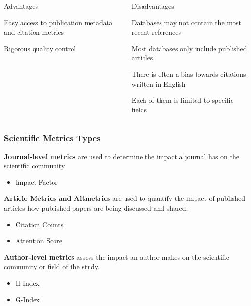 \documentclass{beamer}
\begin{document}
\begin{frame}

    \begin{columns}[T]
        \begin{column}{.5\textwidth}
            \centering Advantages
            \begin{propslist}
                \item Easy access to publication metadata and citation metrics
                \pause
                \item Rigorous quality control \pause
            \end{propslist}
        \end{column}
        \begin{column}{.5\textwidth}
            \centering Disadvantages %
            \begin{conslist}
                \item Databases may not contain the most recent references \pause
                \item Most databases only include published articles \pause
                \item There is often a bias towards citations written in English \pause
                \item Each of them is limited to specific fields \pause
            \end{conslist}
        \end{column}
    \end{columns}
\end{frame}
\begin{frame}

    \frametitle{Scientific Metrics Types}
    \textbf{Journal-level metrics} are used to determine the impact a journal has on the scientific community
    \begin{itemize}
        \item Impact Factor
    \end{itemize}
    \textbf{Article Metrics and Altmetrics} are used to quantify the impact of published articles-how published papers are being discussed and shared.
    \begin{itemize}
        \item Citation Counts
        \item Attention Score
    \end{itemize}
    \textbf{Author-level metrics} assess the impact an author makes on the scientific community or field of the study.
    \begin{itemize}
        \item H-Index
        \item G-Index
    \end{itemize}

\end{frame}
\end{document}
